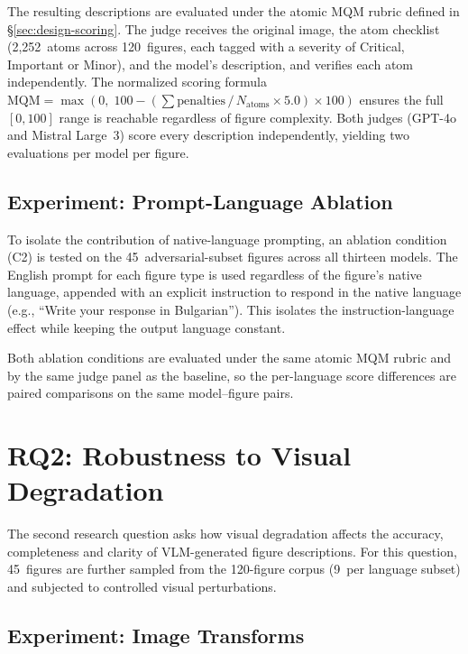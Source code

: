 The resulting descriptions are evaluated under the atomic MQM
rubric defined in \S\ref{sec:design-scoring}. The judge
receives the original image, the atom checklist (2{,}252~atoms
across 120~figures, each tagged with a severity of Critical,
Important or Minor), and the model's description, and verifies
each atom independently. The normalized scoring formula
$\mathrm{MQM} = \max(0,\; 100 - (\sum\mathrm{penalties}\,/\,
N_{\mathrm{atoms}} \times 5.0) \times 100)$ ensures the full
$[0, 100]$ range is reachable regardless of figure complexity.
Both judges (GPT-4o and Mistral Large~3) score every
description independently, yielding two evaluations per model
per figure.

\subsection{Experiment: Prompt-Language Ablation}
\label{sec:impl-rq1-ablation}

To isolate the contribution of native-language prompting, an
ablation condition (C2) is tested on the 45~adversarial-subset
figures across all thirteen models. The English prompt for each
figure type is used regardless of the figure's native language,
appended with an explicit instruction to respond in the native
language (e.g., ``Write your response in Bulgarian''). This
isolates the instruction-language effect while keeping the
output language constant.

Both ablation conditions are evaluated under the same atomic
MQM rubric and by the same judge panel as the baseline, so
the per-language score differences are paired comparisons on
the same model--figure pairs.


\section{RQ2: Robustness to Visual Degradation}
\label{sec:impl-rq2}

The second research question asks how visual degradation affects
the accuracy, completeness and clarity of VLM-generated figure
descriptions. For this question, 45~figures are further sampled
from the 120-figure corpus (9~per language subset) and subjected
to controlled visual perturbations.

\subsection{Experiment: Image Transforms}
\label{sec:impl-rq2-transforms}

